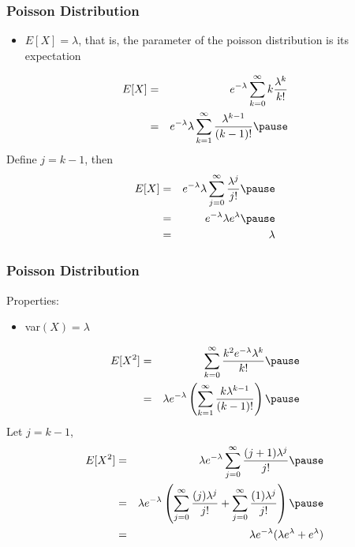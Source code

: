 \documentclass{beamer}
\numberwithin{equation}{section}
\begin{document}
\begin{frame}
\frametitle{Poisson Distribution}

\begin{itemize}
\item[2)] $E[X] = \lambda$, that is, the parameter of the poisson distribution is its expectation
\end{itemize}
\begin{eqnarray}
E[X] & = & e^{-\lambda} \sum_{k=0}^{\infty} k \frac{\lambda^{k}}{k!} \nonumber \\
& = & e^{-\lambda} \lambda \sum_{k=1}^{\infty} \frac{\lambda^{k-1}}{(k-1)!} \nonumber \pause
\end{eqnarray}
Define $j = k-1$, then 
\begin{eqnarray}
E[X]  & = & e^{-\lambda} \lambda \sum_{j=0}^{\infty} \frac{\lambda^{j}}{j!} \nonumber \pause\\
& = & e^{-\lambda} \lambda e^{\lambda} \nonumber \pause\\
& = & \lambda \nonumber 
\end{eqnarray}



\end{frame}

\begin{frame}
\frametitle{Poisson Distribution}
Properties:

\begin{itemize}
\item[3)] var$(X) = \lambda$\pause
\end{itemize}

\begin{eqnarray}
E[X^2] & = & \sum_{k=0}^{\infty} \frac{k^2 e^{-\lambda} \lambda^{k}}{k!} \nonumber \pause\\
& = & \lambda e^{-\lambda} \left(\sum_{k=1}^{\infty} \frac{k \lambda^{k-1}}{(k-1)!}\right)\nonumber \pause
\end{eqnarray}
Let $j = k-1$,\pause
\begin{eqnarray}
E[X^2] & = & \lambda e^{-\lambda} \sum_{j=0}^{\infty} \frac{(j+1) \lambda^{j}}{j!} \nonumber \pause \\
& = & \lambda e^{-\lambda} \left(\sum_{j=0}^{\infty} \frac{(j) \lambda^{j}}{j!} + \sum_{j=0}^{\infty} \frac{(1) \lambda^{j}}{j!} \right) \nonumber \pause \\
& = & \lambda e^{-\lambda} (\lambda e^{\lambda} + e^{\lambda} ) \nonumber \\
\end{eqnarray}


\end{frame}
\end{document}
